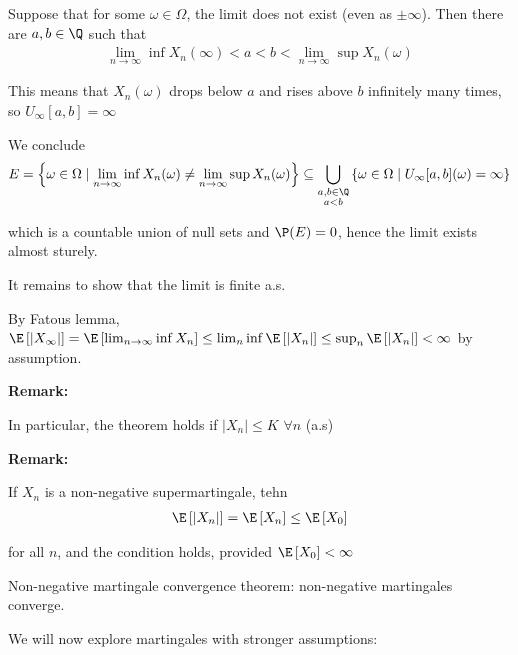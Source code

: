\par\bigskip
\begin{prf}{}
  Suppose that for some $\omega\in\Omega$, the limit does not exist (even as $\pm\infty$). Then there are $a,b\in\Q$ such that
  \begin{equation*}
    \begin{gathered}
      \lim_{n\to\infty}\inf X_n(\infty)<a<b<\lim_{n\to\infty}\sup X_n(\omega)
    \end{gathered}
  \end{equation*}\par
  \noindent This means that $X_n(\omega)$ drops below $a$ and rises above $b$ infinitely many times, so $U_{\infty}[a,b]=\infty$
  \par\bigskip
  \noindent We conclude
  \begin{equation*}
    \begin{gathered}
      E = \left\{\omega\in\Omega\mid \lim_{n\to\infty}\inf X_n(\omega)\neq\lim_{n\to\infty}\sup X_n(\omega)\right\}\subseteq \bigcup_{\substack{a,b\in\Q\\ a<b}}\left\{\omega\in\Omega\mid U_\infty[a,b](\omega)=\infty\right\}
    \end{gathered}
  \end{equation*}
  \par\bigskip
  \noindent which is a countable union of null sets and $\P(E) = 0$, hence the limit exists almost sturely.
  \par\bigskip
  \noindent It remains to show that the limit is finite a.s.\par
  \noindent By Fatous lemma, $\E\left[\left|X_\infty\right|\right] = \E\left[\lim_{n\to\infty}\inf X_n\right]\leq \lim_{n}\inf \E\left[\left|X_n\right|\right]\leq \sup_n\E\left[\left|X_n\right|\right]<\infty$ by assumption.
\end{prf}
\par\bigskip
\noindent\textbf{Remark:}\par
\noindent In particular, the theorem holds if $\left|X_n\right|\leq K$ $\forall n$ (a.s)
\par\bigskip
\noindent\textbf{Remark:}\par
\noindent If $X_n$ is a non-negative supermartingale, tehn 
\begin{equation*}
  \begin{gathered}
    \E\left[\left|X_n\right|\right]= \E\left[X_n\right]\leq \E\left[X_0\right]
  \end{gathered}
\end{equation*}\par
\noindent for all $n$, and the condition holds, provided $\E\left[X_0\right]<\infty$
\par\bigskip
\noindent Non-negative martingale convergence theorem: non-negative martingales converge.
\par\bigskip
\noindent We will now explore martingales with stronger assumptions:
